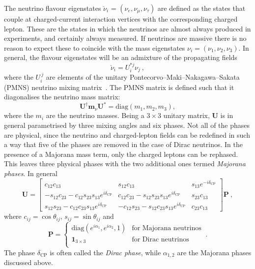 The neutrino flavour eigenstates $\breve{\nu}_{i}$ =
$(\nu_{e}, \nu_{\mu}, \nu_{\tau})$ are defined as the states that couple at
charged-current interaction vertices with the corresponding charged lepton.
These are the states in which the neutrinos are almost always produced in
experiments, and certainly always measured. If neutrinos are massive there is no
reason to expect these to coincide with the mass eigenstates
$\nu_{i} = (\nu_{1}, \nu_{2}, \nu_{3})$. In general, the flavour eigenstates
will be an admixture of the propagating fields
\begin{equation}
  \label{eq:neutrino-mixing}
  \breve{\nu}_{i} = U_{i}^{* j} \nu_{j} \ ,
\end{equation}
where the $U_{i}^{\ j}$ are elements of the unitary
Pontecorvo--Maki--Nakagawa--Sakata (PMNS) neutrino mixing
matrix~\cite{Pontecorvo:1957cp, Maki:1962mu}. The PMNS matrix is defined such
that it diagonalises the neutrino mass matrix:
\begin{equation}
  \mathbf{U}^{\dagger} \mathbf{m}_{\nu} \mathbf{U}^{*} = \mathrm{diag}(m_{1}, m_{2}, m_{3}),
\end{equation}
where the $m_i$ are the neutrino masses. Being a $3 \times 3$ unitary matrix,
$\mathbf{U}$ is in general parametrised by three mixing angles and six phases.
Not all of the phases are physical, since the neutrino and charged-lepton fields
can be redefined in such a way that five of the phases are removed in the case
of Dirac neutrinos. In the presence of a Majorana mass term, only the charged
leptons can be rephased. This leaves three physical phases with the two
additional ones termed \textit{Majorana phases}. In general
\begin{equation}
  \label{eq:pmns}
  \mathbf{U} =
  \begin{bmatrix}
    c_{12}c_{13} & s_{12} c_{13} & s_{13}e^{-i\delta_\text{CP}} \\
    -s_{12}c_{23} - c_{12}s_{23}s_{13}e^{i\delta_\text{CP}} & c_{12}c_{23} - s_{12}s_{23}s_{13}e^{i\delta_\text{CP}} & s_{23}c_{13}\\
    s_{12}s_{23} - c_{12}c_{23}s_{13}e^{i\delta_\text{CP}} & -c_{12}s_{23} - s_{12}c_{23}s_{13}e^{i\delta_\text{CP}} & c_{23}c_{13}
  \end{bmatrix}
  \mathbf{P} \ ,
\end{equation}
where $c_{ij} = \cos \theta_{ij}$, $s_{ij} = \sin \theta_{ij}$ and
\begin{equation}
  \mathbf{P} =
  \begin{cases}
    \mathrm{diag}(e^{i \alpha_{1}}, e^{i \alpha_{2}}, 1) & \text{for Majorana neutrinos} \\
    \mathbf{1}_{3 \times 3} & \text{for Dirac neutrinos} \\
  \end{cases} \ .
\end{equation}
The phase $\delta_{\text{CP}}$ is often called the \textit{Dirac phase}, while
$\alpha_{1,2}$ are the Majorana phases discussed above.

